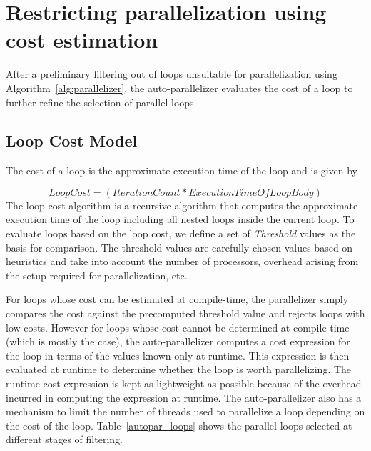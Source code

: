 
\section{Restricting parallelization using cost estimation}
\label{cost}

After a preliminary filtering out of loops unsuitable for
parallelization using Algorithm~\ref{alg:parallelizer}, the
auto-parallelizer evaluates the cost of a loop to further refine the
selection of parallel loops. 

\subsection{Loop Cost Model}
The
cost of a loop is the approximate execution time of the loop and is
given by 

{\small
\begin{displaymath}
       LoopCost = (IterationCount * ExecutionTimeOfLoopBody)
\end{displaymath}
}
The loop cost algorithm is a recursive algorithm that computes the
approximate execution time of the loop including all nested loops
inside the current loop. To evaluate loops based on the loop cost, we
define a set of \emph{Threshold} values as the basis for comparison.
The threshold values are carefully chosen values based on heuristics
and take into account the number of processors, overhead arising from
the setup required for parallelization, etc.

For loops whose cost can be estimated at compile-time, the parallelizer
simply compares the cost against the precomputed threshold value and
rejects loops with low costs. However for loops whose cost cannot be
determined at compile-time (which is mostly the case), the
auto-parallelizer computes a cost expression for the loop in terms of the
values known only at runtime. This expression is then evaluated at
runtime to determine whether the loop is worth parallelizing. The
runtime cost expression is kept as lightweight as possible because of
the overhead incurred in computing the expression at runtime. The
auto-parallelizer also has a mechanism to limit the number of threads
used to parallelize a loop depending on the cost of the loop.
Table~\ref{autopar_loops} shows the parallel loops selected at
different stages of filtering.

